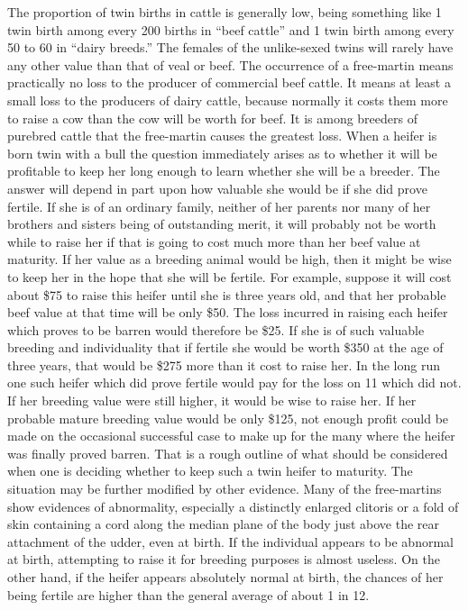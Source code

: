 The proportion of twin births in cattle is generally low, being something
like 1 twin birth among every 200 births in ``beef cattle'' and 1
twin birth among every 50 to 60 in ``dairy breeds.'' The females of the
unlike-sexed twins will rarely have any other value than that of veal or
beef. The occurrence of a free-martin means practically no loss to the
producer of commercial beef cattle. It means at least a small loss to the
producers of dairy cattle, because normally it costs them more to raise a
cow than the cow will be worth for beef. It is among breeders of purebred
cattle that the free-martin causes the greatest loss. When a heifer
is born twin with a bull the question immediately arises as to whether
it will be profitable to keep her long enough to learn whether she will
be a breeder. The answer will depend in part upon how valuable she
would be if she did prove fertile. If she is of an ordinary family, neither
of her parents nor many of her brothers and sisters being of outstanding
merit, it will probably not be worth while to raise her if that is going to
cost much more than her beef value at maturity. If her value as a
breeding animal would be high, then it might be wise to keep her in the
hope that she will be fertile. For example, suppose it will cost about \$75
to raise this heifer until she is three years old, and that her probable
beef value at that time will be only \$50. The loss incurred in raising
each heifer which proves to be barren would therefore be \$25. If she is
of such valuable breeding and individuality that if fertile she would be
worth \$350 at the age of three years, that would be \$275 more than it
cost to raise her. In the long run one such heifer which did prove fertile
would pay for the loss on 11 which did not. If her breeding value were
still higher, it would be wise to raise her. If her probable mature
breeding value would be only \$125, not enough profit could be made
on the occasional successful case to make up for the many where the
heifer was finally proved barren. That is a rough outline of what should
be considered when one is deciding whether to keep such a twin heifer
to maturity. The situation may be further modified by other evidence.
Many of the free-martins show evidences of abnormality, especially a
distinctly enlarged clitoris or a fold of skin containing a cord along the
median plane of the body just above the rear attachment of the udder,
even at birth. If the individual appears to be abnormal at birth,
attempting to raise it for breeding purposes is almost useless. On the
other hand, if the heifer appears absolutely normal at birth, the chances
of her being fertile are higher than the general average of about 1 in 12.


